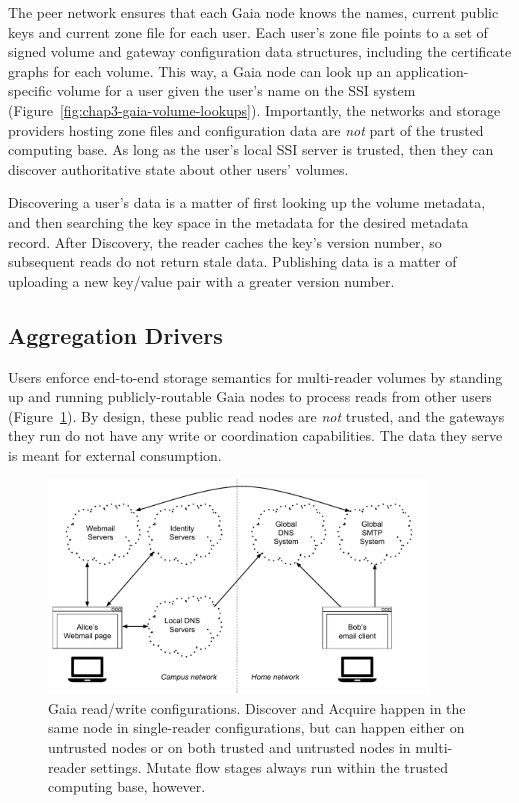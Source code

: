 The peer network ensures that each Gaia node knows the names, current public
keys and current zone file for each user.  Each user's
zone file points to a set of signed volume and gateway configuration data
structures, including the certificate graphs for each volume. 
This way, a Gaia node can
look up an application-specific volume for a user given the user's name on the
SSI system (Figure~\ref{fig:chap3-gaia-volume-lookups}).  Importantly, the networks and storage
providers hosting zone files and configuration data are \emph{not} part
of the trusted computing base.  As long as the user's local SSI server is
trusted, then they can discover authoritative state about other users' volumes.

Discovering a user's data is a matter of first looking up the volume metadata, and then
searching the key space in the metadata for the desired metadata record.  After
Discovery, the reader caches the key's version number, so subsequent reads do
not return stale data.  Publishing data is a matter of uploading a new key/value
pair with a greater version number.

\subsection{Aggregation Drivers}

Users enforce end-to-end storage semantics for multi-reader volumes by standing up and running
publicly-routable Gaia nodes to process reads from other users
(Figure~\ref{fig:chap3-gaia-reads-writes}).  By design,
these public read nodes are \emph{not} trusted, and the gateways they run do not
have any write or coordination capabilities.  The data they serve is
meant for external consumption.

\begin{figure}[h]
   \centering
   \includegraphics[width=0.9\textwidth,page=19]{figures/dissertation-figures}
   \caption{Gaia read/write configurations.  Discover and Acquire happen in the
   same node in single-reader configurations, but can happen either on untrusted
   nodes or on both trusted and untrusted nodes in multi-reader settings.
   Mutate flow stages always run within the trusted computing base, however.}
   \label{fig:chap3-gaia-reads-writes}
\end{figure}

